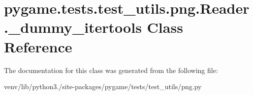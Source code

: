 \hypertarget{classpygame_1_1tests_1_1test__utils_1_1png_1_1_reader_1_1__dummy__itertools}{}\section{pygame.\+tests.\+test\+\_\+utils.\+png.\+Reader.\+\_\+dummy\+\_\+itertools Class Reference}
\label{classpygame_1_1tests_1_1test__utils_1_1png_1_1_reader_1_1__dummy__itertools}


The documentation for this class was generated from the following file\+:\begin{DoxyCompactItemize}
\item 
venv/lib/python3./site-\/packages/pygame/tests/test\+\_\+utils/png.\+py\end{DoxyCompactItemize}
